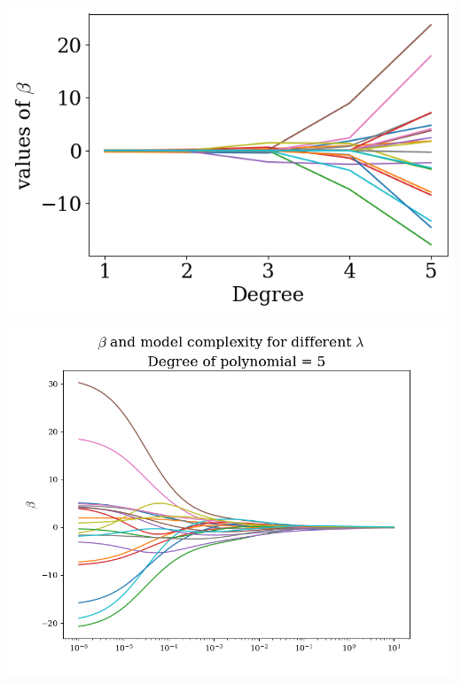 \documentclass[twoside,11pt]{report}
\begin{document}
\begin{minipage}[!t]{.48\linewidth}
    \begin{center}
        \includegraphics[width=1.0\textwidth]{../runsAndAdditions/betaOverOrderOLS.png}
\end{center}
\end{minipage}
\hspace{4mm}
\begin{minipage}[!t]{.48\linewidth}
    \begin{center}
        \includegraphics[width=1.0\textwidth]{../runsAndAdditions/BetaOverLambdaRidge5.png}
    \end{center}
\end{minipage}
\end{document}
